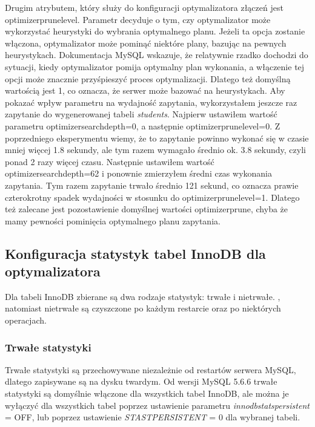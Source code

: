 Drugim atrybutem, który służy do konfiguracji optymalizatora złączeń jest optimizer\textunderscore prune\textunderscore level. Parametr decyduje o tym, czy optymalizator może wykorzystać heurystyki do wybrania optymalnego planu. Jeżeli ta opcja zostanie włączona, optymalizator może pominąć niektóre plany, bazując na pewnych heurystykach. Dokumentacja MySQL wskazuje, że relatywnie rzadko dochodzi do sytuacji, kiedy optymalizator pomija optymalny plan wykonania, a włączenie tej opcji może znacznie przyśpieszyć proces optymalizacji. Dlatego też domyślną wartością jest 1, co oznacza, że serwer może bazować na heurystykach. Aby pokazać wpływ parametru na wydajność zapytania, wykorzystałem jeszcze raz zapytanie do wygenerowanej tabeli \textit{students}. Najpierw ustawiłem wartość parametru optimizer\textunderscore search\textunderscore depth=0, a następnie optimizer\textunderscore prune\textunderscore level=0. Z poprzedniego eksperymentu wiemy, że to zapytanie powinno wykonać się w czasie mniej więcej 1.8 sekundy, ale tym razem wymagało średnio ok. 3.8 sekundy, czyli ponad 2 razy więcej czasu. Następnie ustawiłem wartość optimizer\textunderscore search\textunderscore depth=62 i ponownie zmierzyłem średni czas wykonania zapytania. Tym razem zapytanie trwało średnio 121 sekund, co oznacza prawie czterokrotny spadek wydajności w stosunku do
optimizer\textunderscore prune\textunderscore level=1. Dlatego też zalecane jest pozostawienie domyślnej wartości optimizer\textunderscore prune, chyba że mamy pewności pominięcia optymalnego planu zapytania.

\subsection{Konfiguracja statystyk tabel InnoDB dla optymalizatora}
Dla tabeli InnoDB zbierane są dwa rodzaje statystyk: trwałe i nietrwałe. , natomiast nietrwałe są czyszczone po każdym restarcie oraz po niektórych operacjach.

\subsubsection{Trwałe statystyki}
Trwałe statystyki są przechowywane niezależnie od restartów serwera MySQL, dlatego zapisywane są na dysku twardym. Od wersji MySQL 5.6.6 trwałe statystyki są domyślnie włączone dla wszystkich tabel InnoDB, ale można je wyłączyć dla wszystkich tabel poprzez ustawienie parametru \textit{innodb\textunderscore stats\textunderscore persistent} = OFF, lub poprzez ustawienie \textit{STAST\textunderscore PERSISTENT} = 0 dla wybranej tabeli.

